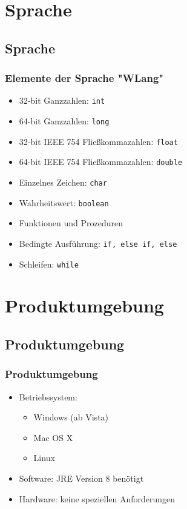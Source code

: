 \documentclass{beamer}
\begin{document}
\section{Sprache}
\subsection{Sprache}
\begin{frame}
\frametitle{Elemente der Sprache "WLang"}
\begin{itemize}
\item  32-bit Ganzzahlen: \texttt{int}
  \item  64-bit Ganzzahlen: \texttt{long}
 \item  32-bit IEEE 754 Fließkommazahlen: \texttt{float}
 \item   64-bit IEEE 754 Fließkommazahlen: \texttt{double}
  \item  Einzelnes Zeichen: \texttt{char}
  \item  Wahrheitswert: \texttt{boolean}
\item Funktionen und Prozeduren %
\item Bedingte Ausführung: \texttt{if, else if, else}
\item Schleifen: \texttt{while}
\end{itemize}
\end{frame}


\section{Produktumgebung}
\subsection{Produktumgebung}
\begin{frame}
\frametitle{Produktumgebung}
\begin{itemize}
\item Betriebssystem:
\begin{itemize}
\item Windows (ab Vista)
\item Mac OS X
\item Linux
\end{itemize}
\item Software: JRE Version 8 benötigt 
\item Hardware: keine speziellen Anforderungen
\end{itemize}
\end{frame}
\end{document}
